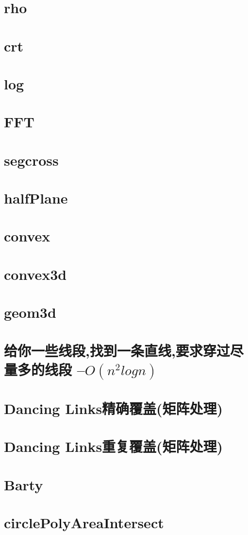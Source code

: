 \documentclass[
	10pt,
	twocolumn,
	a4paper,
]{article}
\begin{document}
\section{rho}

\section{crt}

\section{log}

\section{FFT}


\section{segcross}

\section{halfPlane}

\section{convex}

\section{convex3d}

\section{geom3d}

\section{给你一些线段,找到一条直线,要求穿过尽量多的线段 –$O(n^2logn)$}


%
\section{Dancing Links精确覆盖(矩阵处理)}

\section{Dancing Links重复覆盖(矩阵处理)}

\section{Barty}

\section{circlePolyAreaIntersect}

%
\end{document}
